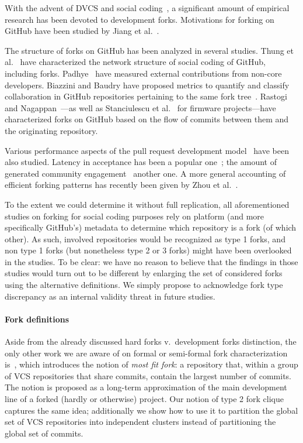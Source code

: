 With the advent of DVCS and social coding~\cite{lima2014ghsocial}, a
significant amount of empirical research has been devoted to development
forks. Motivations for forking on GitHub have been studied by Jiang et
al.~\cite{jiang2017whyfork}.

The structure of forks on GitHub has been analyzed in several studies. Thung et
al.~\cite{thung2013network} have characterized the network structure of social
coding of GitHub, including forks. Padhye~\cite{padhye2014extcontrib} have
measured external contributions from non-core developers. Biazzini and Baudry
have proposed metrics to quantify and classify collaboration in GitHub
repositories pertaining to the same fork tree~\cite{biazzini2014maythefork}.
Rastogi and Nagappan~\cite{rastogi2016forking}---as well as Stanciulescu et
al.~\cite{stuanciulescu2015forked} for firmware projects---have characterized
forks on GitHub based on the flow of commits between them and the originating
repository.

Various performance aspects of the pull request development
model~\cite{gousios2014pullrequests, gousios2015work} have been also
studied. Latency in acceptance has been a popular one~\cite{yu2015waitforit,
  tsay2014influence}; the amount of generated community
engagement~\cite{dabbish2012socialcoding, dabbish2012transparency} another one.
A more general accounting of efficient forking patterns has recently been given
by Zhou et al.~\cite{zhou2019fork}.

To the extent we could determine it without full replication, all
aforementioned studies on forking for social coding purposes rely on platform
(and more specifically GitHub's) metadata to determine which repository is a
fork (of which other). As such, involved repositories would be recognized as
type 1 forks, and non type 1 forks (but nonetheless type 2 or 3 forks) might
have been overlooked in the studies. To be clear: we have no reason to believe
that the findings in those studies would turn out to be different by enlarging
the set of considered forks using the alternative definitions. We simply
propose to acknowledge fork type discrepancy as an internal validity threat in
future studies.


\paragraph{Fork definitions}

Aside from the already discussed hard forks v.~development forks distinction,
the only other work we are aware of on formal or semi-formal fork
characterization is~\cite{swh-provenance-emse}, which introduces the notion of
\emph{most fit fork}: a repository that, within a group of VCS repositories
that share commits, contain the largest number of commits. The notion is
proposed as a long-term approximation of the main development line of a forked
(hardly or otherwise) project. Our notion of type 2 fork clique captures the
same idea; additionally we show how to use it to partition the global set of
VCS repositories into independent clusters instead of partitioning the global
set of commits.


